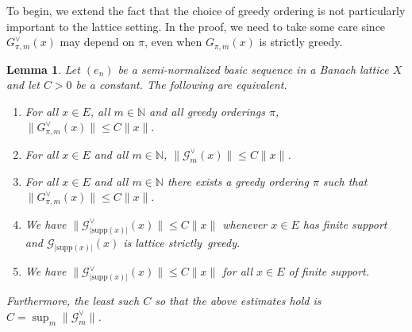 \documentclass[12pt,leqno]{amsart}
\newtheorem{lemma}[theorem]{Lemma}
\numberwithin{equation}{section}
\theoremstyle{definition}
\def\N{{\mathbb N}}
\begin{document}

To begin, we extend the fact  that the choice of greedy ordering is  not particularly important to the lattice setting. In the proof, we need to take some care since $G^\vee_{\pi,m}(x)$ may depend on $\pi$, even when $G_{\pi,m}(x)$ is strictly greedy.

\begin{lemma}\label{equivalence of constants.}
Let $(e_n)$ be a semi-normalized basic sequence in a Banach lattice $X$ and let $C>0$ be a constant. The following are equivalent.
\begin{enumerate}
\item For all $x\in E$, all $m\in \N$ and all greedy orderings $\pi$, $\|G_{\pi,m}^\vee(x)\|\leq C\|x\|.$
\item For all $x\in E$ and all $m\in \N$, $\|\mathcal{G}^\vee_m(x)\|\leq C\|x\|$.
\item For all $x\in E$ and all $m\in \N$ there exists a greedy ordering $\pi$ such that $\|G_{\pi,m}^\vee(x)\|\leq C\|x\|.$
\item  We have $\|{\mathcal{G}^\vee_{|\text{supp} (x)|}}(x)\|\leq C\|x\|$ whenever $x\in E$ has finite support and $\mathcal{G}_{|\text{supp}(x)|}(x)$ is lattice strictly~greedy.
\item We have $\|{\mathcal{G}^\vee_{|\text{supp} (x)|}}(x)\|\leq C\|x\|$ for all $x\in E$ of finite support.

\end{enumerate}
Furthermore, the least such $C$ so that the above estimates hold is  $C=\sup_m\|\mathcal{G}^\vee_m\|$.
\end{lemma}
\end{document}
